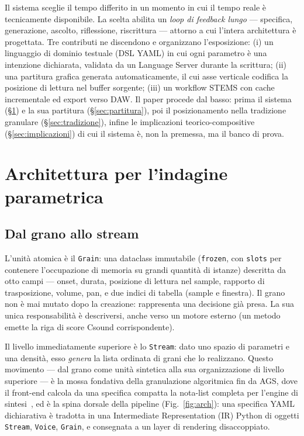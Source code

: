 \documentclass[10pt,twocolumn,a4paper]{article}
\begin{document}
Il sistema sceglie il tempo differito in un momento in cui il tempo
reale è tecnicamente disponibile. La scelta abilita un \emph{loop di
feedback lungo} --- specifica, generazione, ascolto, riflessione,
riscrittura --- attorno a cui l'intera architettura è progettata.
Tre contributi ne discendono e organizzano l'esposizione: (i) un
linguaggio di dominio testuale (DSL YAML) in cui ogni parametro è una
intenzione dichiarata, validata da un Language Server durante la
scrittura; (ii) una partitura grafica generata automaticamente, il cui
asse verticale codifica la posizione di lettura nel buffer sorgente;
(iii) un workflow STEMS con cache incrementale ed export verso DAW. Il
paper procede dal basso: prima il sistema (\S\ref{sec:architettura}) e
la sua partitura (\S\ref{sec:partitura}), poi il posizionamento nella
tradizione granulare (\S\ref{sec:tradizione}), infine le implicazioni
teorico-compositive (\S\ref{sec:implicazioni}) di cui il sistema è,
non la premessa, ma il banco di prova.

\section{Architettura per l'indagine parametrica}
\label{sec:architettura}

\subsection{Dal grano allo stream}

L'unità atomica è il \texttt{Grain}: una dataclass immutabile
(\texttt{frozen}, con \texttt{slots} per contenere l'occupazione di
memoria su grandi quantità di istanze) descritta da otto campi ---
onset, durata, posizione di lettura nel sample, rapporto di
trasposizione, volume, pan, e due indici di tabella (sample e
finestra). Il grano non è mai mutato dopo la creazione: rappresenta una
decisione già presa. La sua unica responsabilità è descriversi, anche
verso un motore esterno (un metodo emette la riga di score Csound
corrispondente).

Il livello immediatamente superiore è lo \texttt{Stream}: dato uno
spazio di parametri e una densità, esso \emph{genera} la lista ordinata
di grani che lo realizzano. Questo movimento --- dal grano come unità
sintetica alla sua organizzazione di livello superiore --- è la mossa
fondativa della granulazione algoritmica fin da AGS, dove il front-end
calcola da una specifica compatta la nota-list completa per l'engine di
sintesi~\cite{Roads1978}, ed è la spina dorsale della pipeline
(Fig.~\ref{fig:arch}): una specifica YAML dichiarativa è tradotta in una
Intermediate Representation (IR) Python di oggetti \texttt{Stream},
\texttt{Voice}, \texttt{Grain}, e consegnata a un layer di rendering
disaccoppiato.
\end{document}
